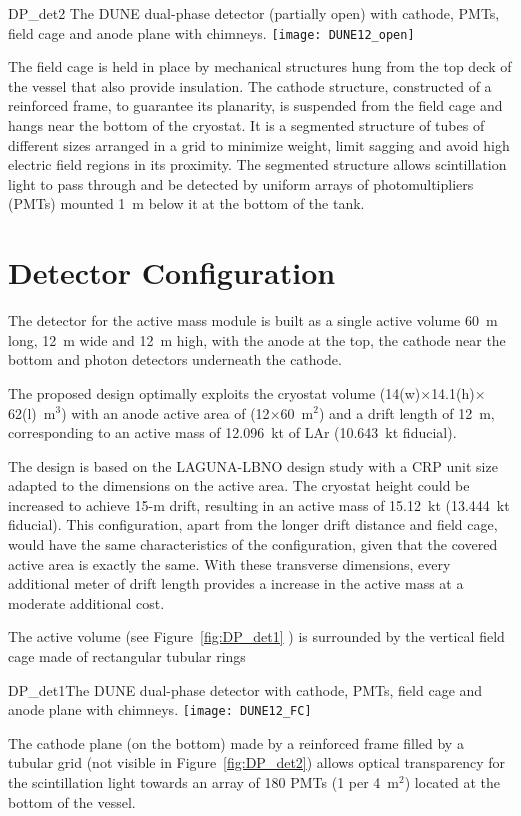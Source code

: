 \begin{cdrfigure}{DP_det2}
{The DUNE dual-phase detector (partially open) with cathode, PMTs, field cage and anode plane with chimneys.}
\texttt{[image: DUNE12\_open]}
\end{cdrfigure}

The field cage is held in place by mechanical structures hung from the
top deck of the vessel that also provide insulation.  The cathode
structure, constructed of a reinforced frame, to 
guarantee its planarity, is suspended from the field cage and hangs near the 
bottom of the cryostat. It is a segmented structure of tubes of different sizes 
arranged in a grid to minimize weight, limit sagging and avoid high electric field
regions in its proximity.  The segmented structure allows scintillation light to pass
through and be detected by uniform arrays of photomultipliers (PMTs) mounted
1~m below it at the bottom of the tank.

\section{Detector Configuration}

The detector for the  active mass module is built as a single
active volume 60~m long, 12~m wide and 12~m high, with the anode at the
top, the cathode near the bottom and photon detectors underneath the cathode. 

The proposed design optimally exploits the
cryostat volume (14(w)$\times$14.1(h)$\times$62(l)~m$^3$) with an
anode active area of (12$\times$60~m$^2$) and a drift length of 12~m,
corresponding to an active mass of 12.096~kt of LAr (10.643~kt
fiducial).

 The design is based on the  LAGUNA-LBNO design study
with a CRP unit size adapted to the dimensions on the active area. The
cryostat height could be increased to achieve 15-m drift, resulting in
an active mass of 15.12~kt (13.444~kt fiducial).  This 
configuration, apart from the longer drift distance and field cage,
would have the same characteristics of the  configuration,
given that the covered active area is exactly the same. With these
transverse dimensions, every additional meter of drift length provides
a  increase in the active mass at a moderate additional cost.

The active volume (see Figure~\ref{fig:DP_det1} ) is surrounded by the
vertical field cage made of rectangular tubular rings 
\begin{cdrfigure}{DP_det1}{The DUNE dual-phase 
detector with cathode, PMTs, field cage and anode plane with chimneys.}
\texttt{[image: DUNE12\_FC]}
\end{cdrfigure}
The cathode plane (on the bottom) made by a reinforced frame filled by a tubular grid (not visible in
Figure~\ref{fig:DP_det2}) allows optical transparency for the scintillation light towards an array of 180 PMTs (1 per 4~m$^2$)
located at the bottom of the vessel.

